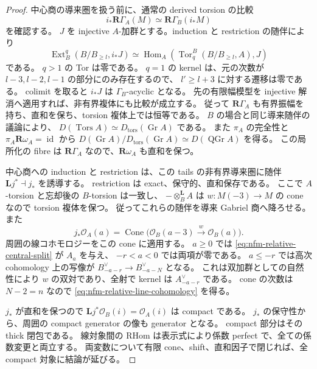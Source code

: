 \begin{proof}
中心商の導来圏を扱う前に、通常の derived torsion の比較
\begin{equation}
\label{eq:nfm-relative-torsion-comparison}
 i_*\mathbf R\Gamma_A(M)\simeq\mathbf R\Gamma_B(i_*M)
\end{equation}
を確認する。
$J$ を injective $A$-加群とする。induction と restriction の随伴により
\[
 \operatorname{Ext}^q_B(B/B_{\geq l},i_*J)
 \simeq\operatorname{Hom}_A(\operatorname{Tor}^B_q(B/B_{\geq l},A),J)
\]
である。
$q>1$ の Tor は零である。
$q=1$ の kernel は、元の次数が $l-3,l-2,l-1$ の部分にのみ存在するので、
$l'\geq l+3$ に対する遷移は零である。
colimit を取ると $i_*J$ は $\Gamma_B$-acyclic となる。
先の有限幅模型を injective 解消へ適用すれば、非有界複体にも比較が成立する。
従って $\mathbf R\Gamma_A$ も有界振幅を持ち、直和を保ち、torsion 複体上では恒等である。
$B$ の場合と同じ導来随伴の議論により、
$D(\operatorname{Tors}A)\simeq D_{\mathrm{tors}}(\operatorname{Gr}A)$ である。
また $\pi_A$ の完全性と $\pi_A\mathbf R\omega_A=\operatorname{id}$ から
$D(\operatorname{Gr}A)/D_{\mathrm{tors}}(\operatorname{Gr}A)
\simeq D(\operatorname{QGr}A)$ を得る。
この局所化の fibre は $\mathbf R\Gamma_A$ なので、$\mathbf R\omega_A$ も直和を保つ。

中心商への induction と restriction は、この tails の非有界導来圏に随伴
$\mathbf Lj^*\dashv j_*$ を誘導する。
restriction は exact、保守的、直和保存である。
ここで $A$-torsion と忘却後の $B$-torsion は一致し、
$-\otimes_B^{\mathbf L}A$ は $w:M(-3)\to M$ の cone なので torsion 複体を保つ。
従ってこれらの随伴を導来 Gabriel 商へ降ろせる。
また
\[
 j_*\mathcal O_A(a)=\operatorname{Cone}
 \bigl(\mathcal O_B(a-3)\xrightarrow{w}\mathcal O_B(a)\bigr).
\]
周囲の線コホモロジーをこの cone に適用する。
$a\geq0$ では \eqref{eq:nfm-relative-central-split} が $A_a$ を与え、
$-r<a<0$ では両項が零である。
$a\leq-r$ では高次 cohomology 上の写像が
$B_{-a-r}^{\vee}\to B_{-a-N}^{\vee}$ となる。
これは双加群としての自然性により $w$ の双対であり、全射で kernel は
$A_{-a-r}^{\vee}$ である。
cone の次数は $N-2=n$ なので \eqref{eq:nfm-relative-line-cohomology} を得る。

$j_*$ が直和を保つので $\mathbf Lj^*\mathcal O_B(i)=\mathcal O_A(i)$ は compact である。
$j_*$ の保守性から、周囲の compact generator の像も generator となる。
compact 部分はその thick 閉包である\cite[Theorems~3.4, 3.8]{NFMKellerDg}。
線対象間の RHom は表示式により係数 perfect で、全ての係数変更と両立する。
両変数について有限 cone、shift、直和因子で閉じれば、全 compact 対象に結論が延びる。
\end{proof}

